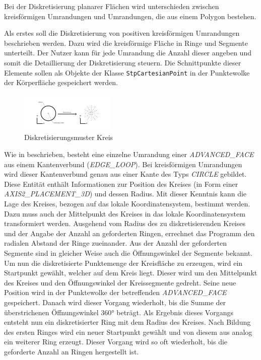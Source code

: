 Bei der Diskretisierung planarer Flächen wird unterschieden zwischen kreisförmigen Umrandungen und Umrandungen, die aus einem Polygon bestehen.

Als erstes soll die Diskretisierung von positiven kreisförmigen Umrandungen beschrieben werden. Dazu wird die kreisförmige Fläche in Ringe und Segmente unterteilt. Der Nutzer kann für jede Umrandung die Anzahl dieser angeben und somit die Detaillierung der Diskretisierung steuern. Die Schnittpunkte dieser Elemente sollen als Objekte der Klasse \verb|StpCartesianPoint| in der Punktewolke der Körperfläche gespeichert werden. 

\begin{figure}[h]
	\centering
	
	\includegraphics[width=\linewidth]{img/discretcircle.pdf}
	
	\caption{Diskretisierungsmuster Kreis}
	\label{fig:discretecircle}
	
\end{figure}

Wie in  beschrieben, besteht eine einzelne Umrandung einer \textit{ADVANCED\_FACE} aus einem Kantenverbund (\textit{EDGE\_LOOP}). Bei kreisförmigen Umrandungen wird dieser Kantenverbund genau aus einer Kante des Typs \textit{CIRCLE} gebildet. Diese Entität enthält Informationen zur Position des Kreises (in Form einer \textit{AXIS2\_PLACEMENT\_3D}) und dessen Radius.
Mit dieser Kenntnis kann die Lage des Kreises, bezogen auf das lokale Koordinatensystem, bestimmt werden. Dazu muss auch der Mittelpunkt des Kreises in das lokale Koordinatensystem transformiert werden. Ausgehend vom Radius des zu diskretisierenden Kreises und der Angabe der Anzahl an geforderten Ringen, errechnet das Programm den radialen Abstand der Ringe zueinander. Aus der Anzahl der geforderten Segmente sind in gleicher Weise auch die Öffnungswinkel der Segmente bekannt. Um nun die diskretisierte Punktemenge der Kreisfläche zu erzeugen, wird ein Startpunkt gewählt, welcher auf dem Kreis liegt. Dieser wird um den Mittelpunkt des Kreises und den Öffnungswinkel der Kreissegmente gedreht. Seine neue Position wird in der Punktewolke der betreffenden \textit{ADVANCED\_FACE} gespeichert. Danach wird dieser Vorgang wiederholt, bis die Summe der überstrichenen Öffnungswinkel 360° beträgt. Als Ergebnis dieses Vorgangs entsteht nun ein diskretisierter Ring mit dem Radius des Kreises. Nach Bildung des ersten Ringes wird ein neuer Startpunkt gewählt und von diesem aus analog ein weiterer Ring erzeugt. Dieser Vorgang wird so oft wiederholt, bis die geforderte Anzahl an Ringen hergestellt ist. 

